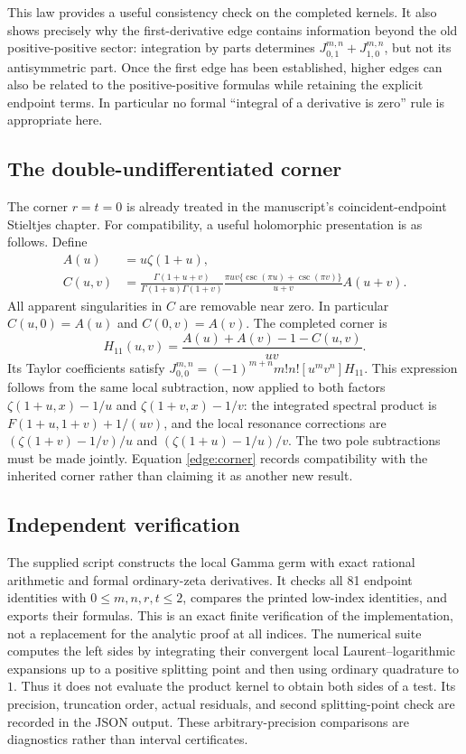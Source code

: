 This law provides a useful consistency check on the completed kernels.
It also shows precisely why the first-derivative edge contains information
beyond the old positive-positive sector: integration by parts determines
$J_{0,1}^{m,n}+J_{1,0}^{m,n}$, but not its antisymmetric part.  Once
the first edge has been established, higher edges can also be related
to the positive-positive formulas while retaining the explicit endpoint
terms.  In particular no formal ``integral of a derivative is zero''
rule is appropriate here.

\subsection{The double-undifferentiated corner}

The corner $r=t=0$ is already treated in the manuscript's
coincident-endpoint Stieltjes chapter.  For compatibility, a useful
holomorphic presentation is as follows.  Define
\begin{align}
 A(u)&=u\zeta(1+u),\\
 C(u,v)&=\frac{\Gamma(1+u+v)}{\Gamma(1+u)\Gamma(1+v)}
   \frac{\pi uv\{\csc(\pi u)+\csc(\pi v)\}}{u+v}
                                    A(u+v).
\end{align}
All apparent singularities in $C$ are removable near zero.  In
particular $C(u,0)=A(u)$ and $C(0,v)=A(v)$.
The completed corner is
\begin{equation}
 H_{11}(u,v)=\frac{A(u)+A(v)-1-C(u,v)}{uv}.
 \label{edge:corner}
\end{equation}
Its Taylor coefficients satisfy
$J_{0,0}^{m,n}=(-1)^{m+n}m!n![u^mv^n]H_{11}$.
This expression follows from the same local subtraction, now applied
to both factors $\zeta(1+u,x)-1/u$ and
$\zeta(1+v,x)-1/v$: the integrated spectral product is
$F(1+u,1+v)+1/(uv)$, and the local resonance corrections are
$(\zeta(1+v)-1/v)/u$ and $(\zeta(1+u)-1/u)/v$.
The two pole subtractions must be made jointly.
Equation \eqref{edge:corner} records compatibility with the inherited
corner rather than claiming it as another new result.


\subsection{Independent verification}

The supplied script constructs the local Gamma germ with exact
rational arithmetic and formal ordinary-zeta derivatives.  It checks
all 81 endpoint identities with $0\le m,n,r,t\le2$, compares the
printed low-index identities, and exports their formulas.  This is
an exact finite verification of the implementation, not a replacement
for the analytic proof at all indices.
The numerical suite computes the left sides by integrating their
convergent local Laurent--logarithmic expansions up to a positive
splitting point and then using ordinary quadrature to $1$.
Thus it does not evaluate the product kernel to obtain both sides
of a test.  Its precision, truncation order, actual residuals, and
second splitting-point check are recorded in the JSON output.
These arbitrary-precision comparisons are diagnostics rather than
interval certificates.
